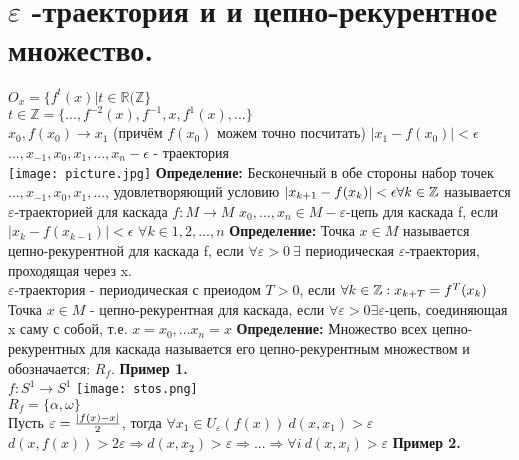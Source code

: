 \documentclass[12pt,a4paper]{article}
\begin{document}
 \section*{\(\varepsilon\) -траектория и и цепно-рекурентное множество.}
 \(O_x=\{f^t(x)|t\in \mathbb{R}(\mathbb{Z}\}\)\\ \(t \in \mathbb{Z}=\{...,f^{-2}(x), f^{-1},x,f^1(x),...\}\) \\ \(x_0,f(x_0)\to x_1\) (причём \(f(x_0)\) можем точно посчитать) \(|x_1 - f(x_0)|<\epsilon\) 
\\
\(...,x_{-1},x_0,x_1,...,x_n - \epsilon\) - траектория
\\
\texttt{[image: picture.jpg]}
\newline \textbf{Определение: } Бесконечный в обе стороны набор точек \(...,x_{-1},x_0,x_1,...\), удовлетворяющий условию \(|x_{k+1} - f(x_k)|<\epsilon\\ \forall k\in \mathbb{Z}\) называется \(\varepsilon\)-траекторией для каскада \(f:M\to M\) 
\newline \(x_0,...,x_n \in M - \varepsilon\)-цепь для каскада f, если \(|x_k - f(x_{k-1})|<\epsilon\) \(\forall k \in 1,2,...,n\)
\newline \textbf{Определение:} Точка \(x \in M\) называется цепно-рекурентной для каскада f, если \(\forall \varepsilon >0 \ \exists\) периодическая \(\varepsilon\)-траектория, проходящая через x.\\
\(\varepsilon\)-траектория - периодическая с преиодом \(T>0\), если \(\forall k\in \mathbb{Z}: \\ x_{k+T} = f^T(x_k)\)\\
Точка \(x \in M\) - цепно-рекурентная для каскада, если \(\forall \varepsilon >0 \exists \varepsilon\)-цепь, соединяющая x саму с собой, т.е. \(x =x_0,...x_n=x\)
\newline \textbf{Определение: } Множество всех цепно-рекурентных для каскада называется его цепно-рекурентным множеством и обозначается: \(R_f\).
\newline \textbf{Пример 1.}
\\
\(f: S^1 \to S^1\) 
\texttt{[image: stos.png]}
\\
\(R_f =\{\alpha , \omega\}\)\\Пусть \(\varepsilon = {|f(x)-x|\over {2}}\), тогда \(\forall x_1 \in U_{\varepsilon} (f(x)) \ d(x,x_1)> \varepsilon\) 
\\ \(d(x,f(x))> 2\varepsilon \Rightarrow d(x,x_2) >\varepsilon \Rightarrow ... \Rightarrow \forall i \ d(x, x_i)> \varepsilon\) 
\newline \textbf{Пример 2.}
\end{document}
